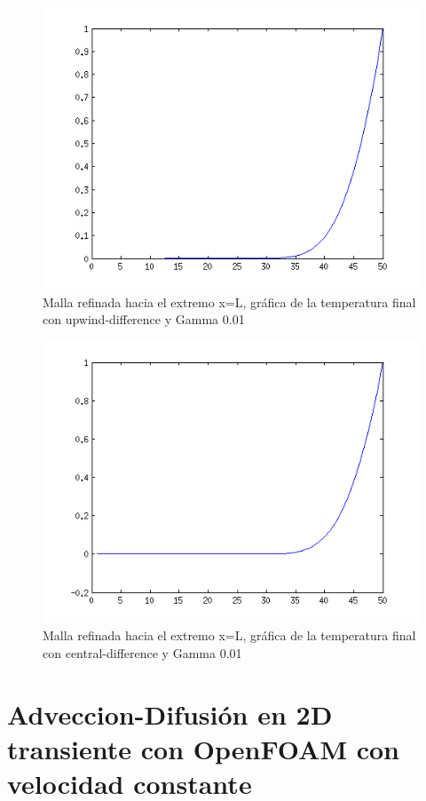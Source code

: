 \documentclass[11pt]{article}
\begin{document}
\begin{figure}[tbh]
	\centering
		\includegraphics[width=1.0\textwidth]{imagen32.png}
	\caption{Malla refinada hacia el extremo x=L, gr\'afica de la temperatura final con upwind-difference y Gamma 0.01}
	\label{fig:Fig1}
\end{figure}

\begin{figure}[tbh]
	\centering
		\includegraphics[width=1.0\textwidth]{imagen33.png}
	\caption{Malla refinada hacia el extremo x=L, gr\'afica de la temperatura final con central-difference y Gamma 0.01}
	\label{fig:Fig1}
\end{figure}

\section{Adveccion-Difusi\'on en 2D transiente con OpenFOAM con velocidad constante}
\end{document}
